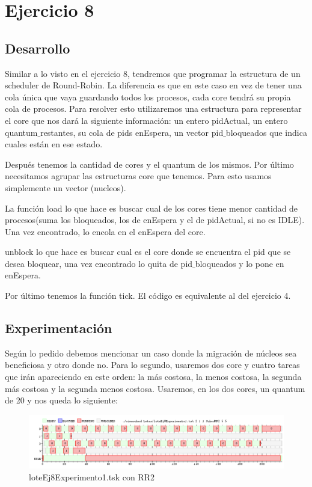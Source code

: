 \section{Ejercicio 8}


\subsection{Desarrollo}
Similar  a lo visto en el ejercicio 8, tendremos que programar la estructura de un scheduler de Round-Robin. La diferencia es que en este caso en vez de tener una cola única 
que vaya guardando todos los procesos, cada core tendrá su propia cola de procesos. Para resolver esto utilizaremos una estructura para representar el core que nos dará la 
siguiente información: un entero pidActual, un entero quantum$\_$restantes, su cola de pids enEspera, un vector pid$\_$bloqueados que indica cuales están en ese estado.

Después tenemos la cantidad de cores y el quantum de los mismos. Por último necesitamos agrupar las estructuras core que tenemos. Para esto usamos simplemente un vector 
(nucleos).

La función load lo que hace es buscar cual de los cores tiene menor cantidad de procesos(suma los bloqueados, los de enEspera y el de pidActual, si no es IDLE). Una vez 
encontrado, lo encola en el enEspera del core.

unblock lo que hace es buscar cual es el core donde se encuentra el pid que se desea bloquear, una vez encontrado lo quita de pid$\_$bloqueados y lo pone en enEspera.

Por último tenemos la función tick. El código es equivalente al del ejercicio 4.


\subsection{Experimentación}
Según lo pedido debemos mencionar un caso donde la migración de núcleos sea beneficiosa y otro donde no. Para lo segundo, usaremos dos core y cuatro tareas que irán apareciendo
en este orden: la más costosa,  la menos costosa, la segunda más costosa y la segunda menos costosa. Usaremos, en los dos cores, un quantum de 20 y nos queda lo siguiente:

\begin{figure}[H]
  \centering
    \includegraphics[width=1.1\textwidth]{imagenes/Ej8Experimento1.png}
  \caption{loteEj8Experimento1.tsk con RR2}
\end{figure}

